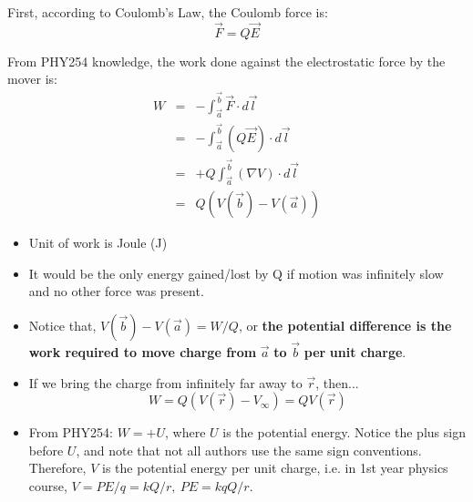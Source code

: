 \documentclass[12pt,a4paper,twoside]{article}
\begin{document}
    \noindent First, according to Coulomb's Law, the Coulomb force is:
    \[\overrightarrow{F}=Q\overrightarrow{E}\]
    
    \noindent From PHY254 knowledge, the work done against the electrostatic force by the mover is:
    \begin{eqnarray*}
    W &=& -\int_{\overrightarrow{a}}^{\overrightarrow{b}}\overrightarrow{F}\cdot d\overrightarrow{l}\\
    &=& -\int_{\overrightarrow{a}}^{\overrightarrow{b}}(Q\overrightarrow{E})\cdot d\overrightarrow{l}\\
    &=& +Q\int_{\overrightarrow{a}}^{\overrightarrow{b}}(\nabla V)\cdot d\overrightarrow{l}\\
    &=& Q(V(\overrightarrow{b})-V(\overrightarrow{a}))
    \end{eqnarray*}
    \begin{itemize}
        \item Unit of work is Joule (J)
        \item It would be the only energy gained/lost by Q if motion was infinitely slow and no other force was present.
        \item Notice that, \(V(\overrightarrow{b})-V(\overrightarrow{a})=W/Q\), or \textbf{the potential difference is the work required to move charge from} $\overrightarrow{a}$ \textbf{to} $\overrightarrow{b}$ \textbf{per} \textbf{unit charge}.
        \item If we bring the charge from infinitely far away to $\overrightarrow{r}$, then...
        \[W=Q(V(\overrightarrow{r})-V_\infty)=QV(\overrightarrow{r})\]
        \item From PHY254: $W=+U$, where $U$ is the potential energy. Notice the plus sign before $U$, and note that not all authors use the same sign conventions.
            \subitem Therefore, $V$ is the potential energy per unit charge, i.e. in 1st year physics course, $V=PE/q=kQ/r,\ PE=kqQ/r$.
    \end{itemize}
\end{document}
